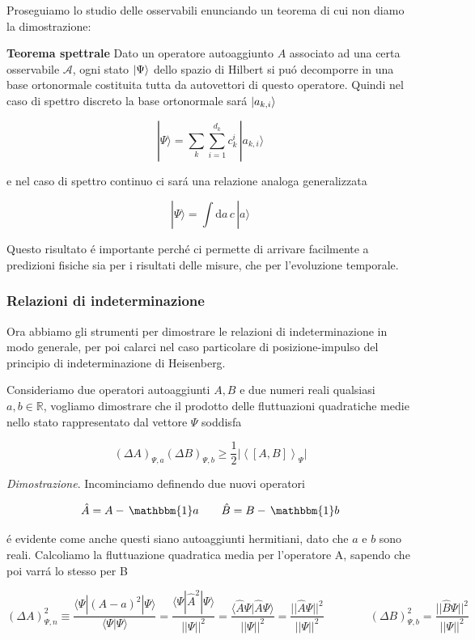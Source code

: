 Proseguiamo lo studio delle osservabili enunciando un teorema di cui non diamo la dimostrazione:

\begin{theorem} \textbf{Teorema spettrale}
	Dato un operatore autoaggiunto $A$ associato ad una certa osservabile $\mathcal{A}$, ogni stato $\ket{\Psi}$ dello spazio di Hilbert si pu\'o decomporre in una base ortonormale costituita tutta da autovettori di questo operatore. Quindi nel caso di spettro discreto la base ortonormale sar\'a $\ket{a_{k,i}}$
	
	$$|\Psi\rangle=\sum_{k}\sum_{i=1}^{d_{k}}c_{k}^{i}\,|a_{k,i}\rangle$$
	
	e nel caso di spettro continuo ci sar\'a una relazione analoga generalizzata
	
	$$|\Psi\rangle=\int\mathrm{d}a\,c\,|a\rangle$$
	
	Questo risultato \'e importante perch\'e ci permette di arrivare facilmente a predizioni fisiche sia per i risultati delle misure, che per l'evoluzione temporale.	
\end{theorem}


\subsubsection{Relazioni di indeterminazione}

Ora abbiamo gli strumenti per dimostrare le relazioni di indeterminazione in modo generale, per poi calarci nel caso particolare di posizione-impulso del principio di indeterminazione di Heisenberg.

Consideriamo due operatori autoaggiunti $A, B$ e due numeri reali qualsiasi $a, b \in \mathbb{R}$, vogliamo dimostrare che il prodotto delle fluttuazioni quadratiche medie nello stato rappresentato dal vettore $\Psi$ soddisfa

$$(\Delta A)_{\Psi,a}(\Delta B)_{\Psi,b}\geq\frac{1}{2}\vert\left<[A,B]\right>_{\Psi}\vert$$

\textit{Dimostrazione}. Incominciamo definendo due nuovi operatori

$$\hat{A}=A-\,\mathbbm{1}a\qquad\hat{B}=B-\,\mathbbm{1}b$$

\'e evidente come anche questi siano autoaggiunti hermitiani, dato che $a$ e $b$ sono reali. Calcoliamo la fluttuazione quadratica media per l'operatore A, sapendo che poi varr\'a lo stesso per B

$$(\Delta A)^{2}_{\Psi,n}\equiv\frac{\langle\Psi|(A-a)^{2}|\Psi\rangle}{\langle\Psi|\Psi\rangle}=\frac{\langle\Psi|\hat{A}^{2}|\Psi\rangle}{||\Psi||^{2}}=\frac{\langle\hat{A}\Psi|\hat{A}\Psi\rangle}{||\Psi||^{2}}=\frac{||\hat{A}\Psi||^{2}}{||\Psi||^{2}}\qquad\qquad(\Delta B)^{2}_{\Psi,b}=\frac{||\hat{B}\Psi||^{2}}{||\Psi||^{2}}$$ 

